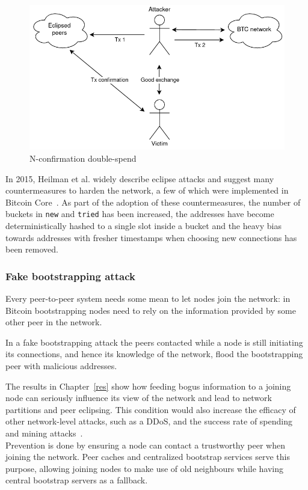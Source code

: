 \documentclass[12pt, letterpaper, twoside]{article}
\begin{document}
\begin{figure}[h!]
	\includegraphics[width=.75\textwidth]{pict/nconfirm-doublespend.png}
	\centering
	\caption{N-confirmation double-spend}
	\label{fig:nconfirm}
\end{figure}

In 2015, Heilman et al. widely describe eclipse attacks and suggest many countermeasures to harden the network, a few of which were implemented in Bitcoin Core~\cite{eclipseatk}. As part of the adoption of these countermeasures, the number of buckets in \texttt{new} and \texttt{tried} has been increased, the addresses have become deterministically hashed to a single slot inside a bucket and the heavy bias towards addresses with fresher timestamps when choosing new connections has been removed.


\subsubsection{Fake bootstrapping attack}\label{sec:fakeboot}
Every peer-to-peer system needs some mean to let nodes join the network: in Bitcoin bootstrapping nodes need to rely on the information provided by some other peer in the network.

In a fake bootstrapping attack the peers contacted while a node is still initiating its connections, and hence its knowledge of the network, flood the bootstrapping peer with malicious addresses.

The results in Chapter~\ref{res} show how feeding bogus information to a joining node can seriously influence its view of the network and lead to network partitions and peer eclipsing. This condition would also increase the efficacy of other network-level attacks, such as a DDoS, and the success rate of spending and mining attacks~\cite{eclipseatk}.\\

Prevention is done by ensuring a node can contact a trustworthy peer when joining the network. Peer caches and centralized bootstrap services serve this purpose, allowing joining nodes to make use of old neighbours while having central bootstrap servers as a fallback.
\end{document}
